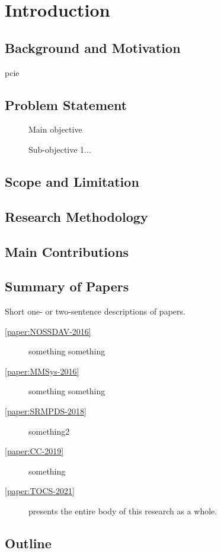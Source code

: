 \chapter{Introduction}\label{sec:intro}
\section{Background and Motivation}
\Gls{pcie}

\section{Problem Statement}
\begin{description}
	\item[] Main objective
	\item[] Sub-objective 1...
\end{description}

\section{Scope and Limitation}

\section{Research Methodology}

\section{Main Contributions}

\section{Summary of Papers}
Short one- or two-sentence descriptions of papers.
\begin{description}
	\item[\cref{paper:NOSSDAV-2016}] something something
	\item[\cref{paper:MMSys-2016}] something something
	\item[\cref{paper:SRMPDS-2018}] something2
	\item[\cref{paper:CC-2019}] something
	\item[\cref{paper:TOCS-2021}] presents the entire body of this research as a whole.
\end{description}

\section{Outline}
